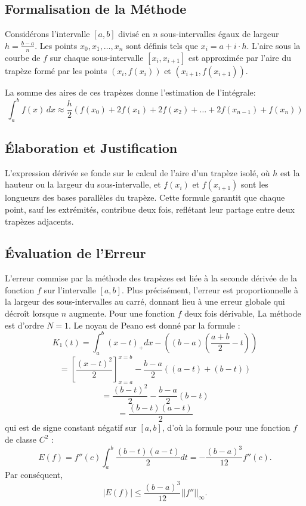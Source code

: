 \documentclass[12pt,a4paper]{article}
\begin{document}
\subsection{Formalisation de la Méthode}
Considérons l'intervalle $[a,b]$ divisé en $n$ sous-intervalles égaux de largeur $h = \frac{b-a}{n}$. Les points $x_0, x_1, \dots, x_n$ sont définis tels que $x_i = a + i \cdot h$. L'aire sous la courbe de $f$ sur chaque sous-intervalle $[x_i, x_{i+1}]$ est approximée par l'aire du trapèze formé par les points $(x_i, f(x_i))$ et $(x_{i+1}, f(x_{i+1}))$.

La somme des aires de ces trapèzes donne l'estimation de l'intégrale:
\[
\int_a^b f(x) \, dx \approx \frac{h}{2} \left( f(x_0) + 2f(x_1) + 2f(x_2) + \dots + 2f(x_{n-1}) + f(x_n) \right)
\]

\subsection{Élaboration et Justification}
L'expression dérivée se fonde sur le calcul de l'aire d'un trapèze isolé, où $h$ est la hauteur ou la largeur du sous-intervalle, et $f(x_i)$ et $f(x_{i+1})$ sont les longueurs des bases parallèles du trapèze. Cette formule garantit que chaque point, sauf les extrémités, contribue deux fois, reflétant leur partage entre deux trapèzes adjacents.

\subsection{Évaluation de l'Erreur}
L'erreur commise par la méthode des trapèzes est liée à la seconde dérivée de la fonction $f$ sur l'intervalle $[a,b]$. Plus précisément, l'erreur est proportionnelle à la largeur des sous-intervalles au carré, donnant lieu à une erreur globale qui décroît lorsque $n$ augmente. Pour une fonction $f$ deux fois dérivable,
La méthode est d'ordre $N = 1$. Le noyau de Peano est donné par la formule :
\[
K_1(t) = \int_{a}^{b} (x - t)_+ dx - \left( (b-a)  \left( \frac{a+b}{2} - t \right) \right)
\]
\[
= \left[ \frac{(x-t)^2}{2} \right]_{x=a}^{x=b} - \frac{b-a}{2} \left( (a-t) +(b-t) \right)
\]
\[
= \frac{(b-t)^2}{2} - \frac{b-a}{2} \left( b-t \right)
\]
\[
= \frac{(b-t)(a-t)}{2}
\]
qui est de signe constant négatif sur $[a, b]$, d'où la formule pour une fonction $f$ de classe $C^2$ :
\[
E(f) = f''(c) \int_{a}^{b} \frac{(b-t)(a-t)}{2} dt = -\frac{(b-a)^3}{12} f''(c).
\]
Par conséquent,
\[
|E(f)| \leq \frac{(b-a)^3}{12} ||f''||_{\infty}.
\]
\end{document}
